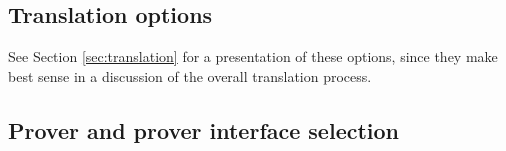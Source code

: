 \documentclass[12pt,fleqn]{article}
\begin{document}
\subsection{Translation options}

See Section \ref{sec:translation} for a presentation of these options,
since they make best sense in a discussion of the overall translation
process.

\subsection{Prover and prover interface selection}
\end{document}
